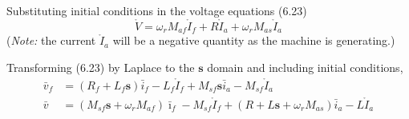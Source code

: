 \documentclass[a4paper,numbers=noenddot,12pt]{scrbook}
\begin{document}
        Substituting initial conditions in the voltage equations (6.23)
        \begin{equation}
            \mathring{V} = \omega_r M_{af} \mathring{I}_f + R \mathring{I}_a + \omega_r M_{as} \mathring{I}_a
            \label{}
        \end{equation}
        (\textit{Note:} the current $\mathring{I}_a$ will be a negative quantity as the machine is generating.)

        Transforming (6.23) by Laplace to the $\mathbf s$ domain and including initial conditions,
        \begin{align}
            \bar v_f & = (R_f + L_f \mathbf{s})\bar i_f - L_f \mathring I_f + M_{sf} \mathbf{s} \bar i_a - M_{sf} \mathring I_a \nonumber \\ %
            \bar v & = (M_{sf} \mathbf{s} + \omega_r M_{af} )\bar \imath_f - M_{sf} \mathring I_f + (R + L \mathbf{s} + \omega_r M_{as})\bar i_a - L\mathring I_a %
            \label{}
        \end{align}
\end{document}
